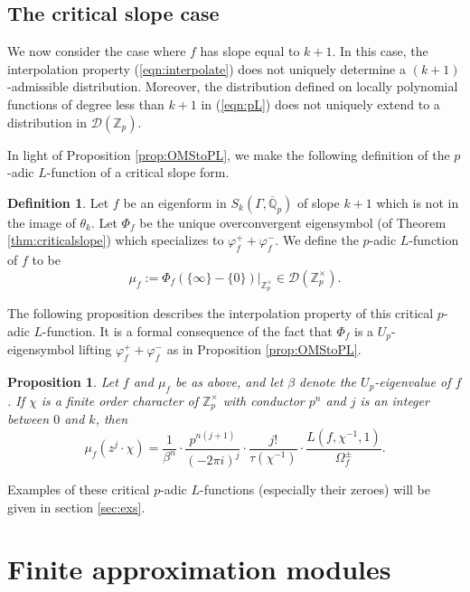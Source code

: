 \documentclass{amsart}
\theoremstyle{plain}
\newtheorem{prop}[thm]{Proposition}
\theoremstyle{definition}
\newtheorem{defn}[thm]{Definition}
\newcommand{\D}{{\mathcal D}}
\newcommand{\Z}{{\mathbb Z}}
\newcommand{\Q}{{\mathbb Q}}
\newcommand{\Qpbar}{\overline{{\Q}}_p}
\newcommand{\Zp}{\Z_p}
\newcommand{\Zpx}{\Z_p^\times}
\newcommand{\Dla}{\D(\Zp)}
\begin{document}
\subsection{The critical slope case}

We now consider the case where $f$ has slope equal to $k+1$.  In this case, the interpolation property (\ref{eqn:interpolate}) does not uniquely determine a $(k+1)$-admissible distribution.  Moreover, the distribution defined on locally polynomial functions of degree less than $k+1$ in (\ref{eqn:pL}) does not uniquely extend to a distribution in $\Dla$.

In light of Proposition \ref{prop:OMStoPL}, we make the following definition of the $p$-adic $L$-function of a critical slope form.

\begin{defn}
\label{def:critical} 
Let $f$ be an eigenform in $S_k(\Gamma,\Qpbar)$ of slope $k+1$ which is not in the image of $\theta_k$.  Let $\Phi_f$ be the unique overconvergent eigensymbol (of Theorem \ref{thm:criticalslope}) which specializes to $\varphi_f^+ + \varphi_f^-$.  We define the $p$-adic $L$-function of $f$ to be
$$
\mu_f := \Phi_f(\{ \infty \} - \{ 0 \})\big|_{\Zpx} \in \D(\Zpx).
$$
\end{defn}

The following proposition describes the interpolation property of
this critical $p$-adic $L$-function.  It is a formal consequence
of the fact that $\Phi_f$ is a $U_p$-eigensymbol lifting
$\varphi_f^+ + \varphi_f^-$ as in Proposition \ref{prop:OMStoPL}.

\begin{prop}
Let $f$ and $\mu_f$ be as above, and let $\beta$ denote the $U_p$-eigenvalue of $f$.  If $\chi$ is a finite order character of $\Zp^\times$ with conductor $p^n$ and $j$ is an integer between $0$ and $k$, then 
\begin{equation}
\mu_f(z^j \cdot \chi) = \frac{1}{\beta^n} \cdot \frac{p^{n(j+1)}}{(-2\pi i) ^j} \cdot \frac{j!}{\tau(\chi^{-1})} \cdot \frac{L(f,\chi^{-1},1)}{\Omega_f^\pm}.
\end{equation}
\end{prop}

Examples of these critical $p$-adic $L$-functions (especially
their zeroes) will be given in section \ref{sec:exs}.



\section{Finite approximation modules}
\label{sec:approx}
\end{document}
